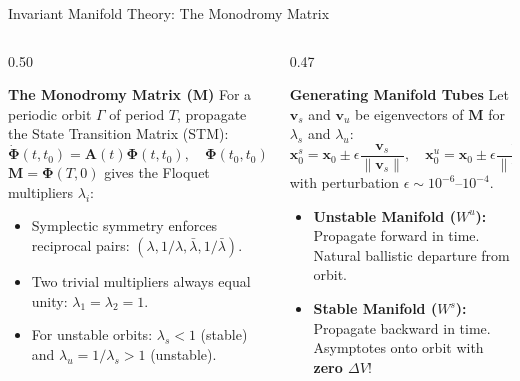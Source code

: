 \documentclass[aspectratio=169, 10pt]{beamer}
\begin{document}
\begin{frame}{Invariant Manifold Theory: The Monodromy Matrix}
    \begin{columns}[t]
        \begin{column}{0.50\textwidth}
            \begin{block}{\textbf{The Monodromy Matrix ($\mathbf{M}$)}}
                \scriptsize
                For a periodic orbit $\Gamma$ of period $T$, propagate the State Transition Matrix (STM):
                \begin{equation*}
                    \dot{\bm{\Phi}}(t, t_0) = \mathbf{A}(t)\bm{\Phi}(t, t_0), \quad \bm{\Phi}(t_0, t_0) = \mathbf{I}_6
                \end{equation*}
                $\mathbf{M} = \bm{\Phi}(T, 0)$ gives the Floquet multipliers $\lambda_i$:
                \begin{itemize}\setlength{\itemsep}{1.5pt}
                    \item Symplectic symmetry enforces reciprocal pairs: $(\lambda, 1/\lambda, \bar{\lambda}, 1/\bar{\lambda})$.
                    \item Two trivial multipliers always equal unity: $\lambda_1 = \lambda_2 = 1$.
                    \item For unstable orbits: $\lambda_s < 1$ (stable) and $\lambda_u = 1/\lambda_s > 1$ (unstable).
                \end{itemize}
            \end{block}
        \end{column}
        
        \begin{column}{0.47\textwidth}
            \begin{block}{\textbf{Generating Manifold Tubes}}
                \scriptsize
                Let $\mathbf{v}_s$ and $\mathbf{v}_u$ be eigenvectors of $\mathbf{M}$ for $\lambda_s$ and $\lambda_u$:
                \begin{equation*}
                    \mathbf{x}_0^{s} = \mathbf{x}_0 \pm \epsilon \frac{\mathbf{v}_s}{\|\mathbf{v}_s\|}, \quad \mathbf{x}_0^{u} = \mathbf{x}_0 \pm \epsilon \frac{\mathbf{v}_u}{\|\mathbf{v}_u\|}
                \end{equation*}
                with perturbation $\epsilon \sim 10^{-6}\text{--}10^{-4}$.
                \begin{itemize}\setlength{\itemsep}{2pt}
                    \item \textbf{Unstable Manifold ($W^u$):} Propagate forward in time. Natural ballistic departure from orbit.
                    \item \textbf{Stable Manifold ($W^s$):} Propagate backward in time. Asymptotes onto orbit with \textbf{zero $\Delta V$}!
                \end{itemize}
            \end{block}
        \end{column}
    \end{columns}
\end{frame}
\end{document}
